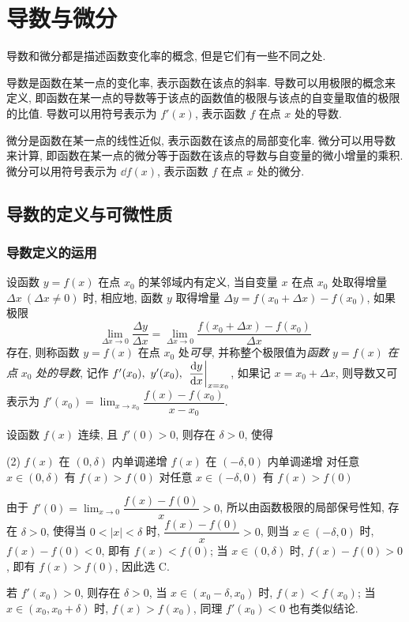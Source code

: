 \section{导数与微分}

导数和微分都是描述函数变化率的概念, 但是它们有一些不同之处. 

导数是函数在某一点的变化率, 表示函数在该点的斜率. 
导数可以用极限的概念来定义, 即函数在某一点的导数等于该点的函数值的极限与该点的自变量取值的极限的比值. 
导数可以用符号表示为 $f'(x)$, 表示函数 $f$ 在点 $x$ 处的导数. 

微分是函数在某一点的线性近似, 表示函数在该点的局部变化率. 
微分可以用导数来计算, 即函数在某一点的微分等于函数在该点的导数与自变量的微小增量的乘积. 
微分可以用符号表示为 $\dd f(x)$, 表示函数 $f$ 在点 $x$ 处的微分. 

\subsection{导数的定义与可微性质}

\subsubsection{导数定义的运用}

\begin{definition}[导数]
    设函数 $y=f(x)$ 在点 $x_0$ 的某邻域内有定义, 当自变量 $x$ 在点 $x_0$ 处取得增量 $\Delta x~(\Delta x\neq 0)$ 时, 相应地, 函数 $y$ 取得增量 $\Delta y=f(x_0+\Delta x)-f(x_0)$, 如果极限
    \label{theDefinitionOfTheDerivationFunction}
    $$\lim_{\Delta x\to0}\dfrac{\Delta y}{\Delta x}=\lim_{\Delta x\to0}\dfrac{f(x_0+\Delta x)-f(x_0)}{\Delta x}$$
    存在, 则称函数 $y=f(x)$ 在点 $x_0$ 处\textit{可导}, 并称整个极限值为\textit{函数} $y=f(x)$ \textit{在点} $x_0$ \textit{处的导数}, 记作 $f'(x_0),~y'(x_0),~\eval{\dfrac{\dd y}{\dd x}}_{x=x_0}$, 
    如果记 $x=x_0+\Delta x$, 则导数又可表示为 $f'(x_0)=\displaystyle\lim_{x\to x_0}\dfrac{f(x)-f(x_0)}{x-x_0}.$
\end{definition}

\begin{example}[2004 数一]
    设函数 $f(x)$ 连续, 且 $f'(0)>0$, 则存在 $\delta>0$, 使得 
    \begin{tasks}(2)
        \task $f(x)$ 在 $(0,\delta)$ 内单调递增
        \task $f(x)$ 在 $(-\delta,0)$ 内单调递增
        \task 对任意 $x\in(0,\delta)$ 有 $f(x)>f(0)$
        \task 对任意 $x\in(-\delta,0)$ 有 $f(x)>f(0)$
    \end{tasks}
\end{example}
\begin{solution}
    由于 $f'(0)=\displaystyle\lim_{x\to0}\dfrac{f(x)-f(0)}{x}>0$, 所以由函数极限的局部保号性知, 存在 $\delta>0$, 使得当 $0<|x|<\delta$ 时, $\dfrac{f(x)-f(0)}{x}>0$, 
    则当 $x\in(-\delta,0)$ 时, $f(x)-f(0)<0$, 即有 $f(x)<f(0)$; 当 $x\in(0,\delta)$ 时, $f(x)-f(0)>0$, 即有 $f(x)>f(0)$, 因此选 C.
\end{solution}
\begin{inference}
    若 $f'(x_0)>0$, 则存在 $\delta>0$, 当 $x\in(x_0-\delta,x_0)$ 时, $f(x)<f(x_0)$; 当 $x\in(x_0,x_0+\delta)$ 时, $f(x)>f(x_0)$, 同理 $f'(x_0)<0$ 也有类似结论.
\end{inference}

